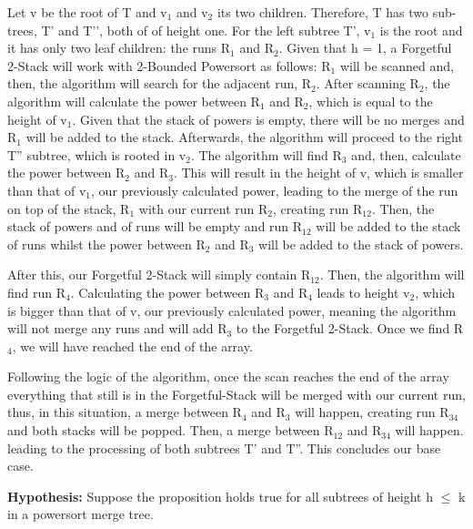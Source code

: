 \documentclass{article}
\begin{document}
Let v be the root of T and v$_1$ and v$_2$ its two children. Therefore, T has two sub-trees, T' and T’’, both of of height one. 
For the left subtree T', v$_1$ is the root and it has only two leaf children: the runs R$_1$ and R$_2$. 
Given that h = 1, a Forgetful 2-Stack will work with 2-Bounded Powersort as follows: 
R$_1$  will be scanned and, then, the algorithm will search for the adjacent run, R$_2$. After scanning R$_2$, 
the algorithm will calculate the power between R$_1$ and R$_2$, which is equal to the height of v$_1$. Given that 
the stack of powers is empty, there will be no merges and R$_1$ will be added to the stack. Afterwards, the algorithm will proceed to the
right T'' subtree, which is rooted in v$_2$. The algorithm will find R$_3$ and, then, calculate the power 
between R$_2$ and R$_3$. This will result in the height of v, which is smaller than that of v$_1$, 
our previously calculated power, leading to the merge of the run on top of the stack, R$_1$ with our current run R$_2$,
creating run R$_{12}$. Then, the stack of powers and of runs will be empty and run R$_{12}$ will be added to the stack
of runs whilst the power between R$_2$ and R$_3$ will be added to the stack of powers.

After this, our Forgetful 2-Stack will simply contain R$_{12}$. Then, the algorithm will find run R$_4$. 
Calculating the power between R$_3$ and R$_4$ leads to height v$_2$, 
which is bigger than that of v, our previously calculated power, meaning the algorithm will not merge any 
runs and will add R$_3$  to the Forgetful 2-Stack. 
Once we find R$_4$, we will have reached the end of the array. 

Following the logic of the algorithm, once the scan reaches the end of the array everything that 
still is in the Forgetful-Stack will be merged with our current run, thus, in this situation, a merge between R$_{4}$ and R$_3$ will happen,
creating run R$_{34}$ and both stacks will be popped. Then, a merge between R$_{12}$ and R$_{34}$ will happen.
leading to the processing of both subtrees T' and T''. This concludes our base case. 

\textbf{Hypothesis:}
Suppose the proposition holds true for all subtrees of height h $\leq$ k in a powersort merge tree.
\end{document}
